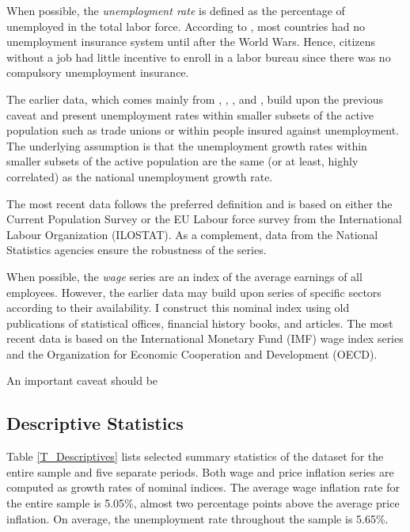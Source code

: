 \documentclass[12pt]{article}
\begin{document}
When possible, the \textit{unemployment rate} is defined as the percentage of unemployed in the total labor force. According to \cite{Rasmussen2018}, most countries had no unemployment insurance system until after the World Wars. Hence, citizens without a job had little incentive to enroll in a labor bureau since there was no compulsory unemployment insurance. 

The earlier data, which comes mainly from \cite{Mitchell2013}, \cite{Tabin2013}, \cite{Maddison1982}, and \cite{Galenson1957}, build upon the previous caveat and present unemployment rates within smaller subsets of the active population such as trade unions or within people insured against unemployment. The underlying assumption is that the unemployment growth rates within smaller subsets of the active population are the same (or at least, highly correlated) as the national unemployment growth rate.

The most recent data follows the preferred definition and is based on either the Current Population Survey or the EU Labour force survey from the International Labour Organization (ILOSTAT). As a complement, data from the National Statistics agencies ensure the robustness of the series.

When possible, the \textit{wage} series are an index of the average earnings of all employees. However, the earlier data may build upon series of specific sectors according to their availability. I construct this nominal index using old publications of statistical offices, financial history books, and articles. The most recent data is based on the International Monetary Fund (IMF) wage index series and the Organization for Economic Cooperation and Development (OECD).

An important caveat should be 

\subsection{Descriptive Statistics}

Table \ref{T_Descriptives} lists selected summary statistics of the dataset for the entire sample and five separate periods. Both wage and price inflation series are computed as growth rates of nominal indices. The average wage inflation rate for the entire sample is 5.05\%, almost two percentage points above the average price inflation. On average, the unemployment rate throughout the sample is 5.65\%.


\end{document}
